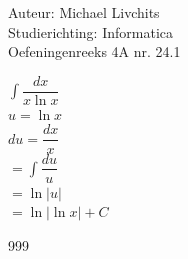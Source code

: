 \documentclass[a4paper]{article}
\begin{document}
  
\noindent \large Auteur: Michael Livchits \\
\noindent \large Studierichting: Informatica\\
\noindent \large Oefeningenreeks 4A nr. 24.1\\

\medskip

\normalsize

$\displaystyle\int\dfrac{dx}{x\ln x}$\\

$u = \ln x$\\

$du = \dfrac{dx}{x}$\\

$= \displaystyle\int\dfrac{du}{u}$\\

$= \ln |u|$\\

$= \ln \left|\ln x\right| + C$\\

\begin{thebibliography}{999}
\end{thebibliography}
\end{document}
